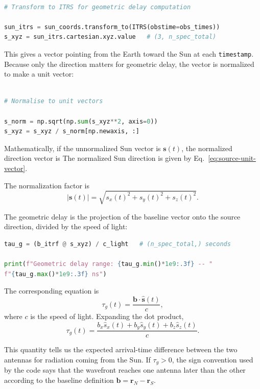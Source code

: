 \documentclass[12pt]{extarticle}
\begin{document}
\begin{lstlisting}[language=Python]

# Transform to ITRS for geometric delay computation

sun_itrs = sun_coords.transform_to(ITRS(obstime=obs_times))
s_xyz = sun_itrs.cartesian.xyz.value   # (3, n_spec_total)
\end{lstlisting}

This gives a vector pointing from the Earth toward the Sun at each \texttt{timestamp}. Because only the direction matters for geometric delay, the vector is normalized to make a unit vector:

\begin{lstlisting}[language=Python]

# Normalise to unit vectors

s_norm = np.sqrt(np.sum(s_xyz**2, axis=0))
s_xyz = s_xyz / s_norm[np.newaxis, :]
\end{lstlisting}

Mathematically, if the unnormalized Sun vector is $\mathbf{s}(t)$, the normalized direction vector is
The normalized Sun direction is given by Eq.~\eqref{eq:source-unit-vector}.

The normalization factor is
\begin{equation}
|\mathbf{s}(t)| = \sqrt{s_x(t)^2 + s_y(t)^2 + s_z(t)^2}.
\end{equation}

The geometric delay is the projection of the baseline vector onto the source direction, divided by the speed of light:

\begin{lstlisting}[language=Python]
tau_g = (b_itrf @ s_xyz) / c_light   # (n_spec_total,) seconds

print(f"Geometric delay range: {tau_g.min()*1e9:.3f} -- "
f"{tau_g.max()*1e9:.3f} ns")
\end{lstlisting}

The corresponding equation is
\begin{equation}
\tau_g(t) = \frac{\mathbf{b} \cdot \hat{\mathbf{s}}(t)}{c},
\end{equation}
where $c$ is the speed of light. Expanding the dot product,
\begin{equation}
\tau_g(t) = \frac{
b_x \hat{s}_x(t) +
b_y \hat{s}_y(t) +
b_z \hat{s}_z(t)
}{c}.
\end{equation}

This quantity tells us the expected arrival-time difference between the two antennas for radiation coming from the Sun. If $\tau_g > 0$, the sign convention used by the code says that the wavefront reaches one antenna later than the other according to the baseline definition $\mathbf{b} = \mathbf{r}_{N} - \mathbf{r}_{S}$.
\end{document}
